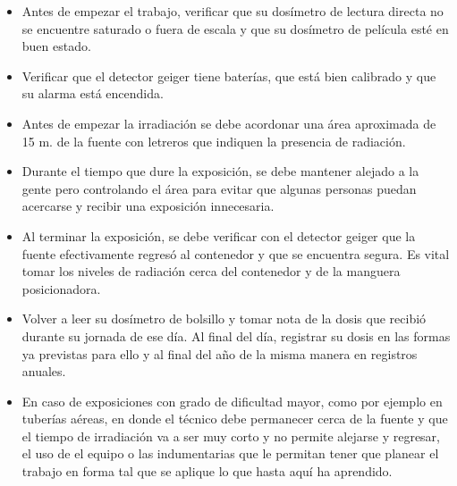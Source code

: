 \begin{itemize}
    \item Antes de empezar el trabajo, verificar que su dosímetro de lectura directa no se encuentre saturado o fuera de escala y que su dosímetro de película esté en buen estado.
    \item Verificar que el detector geiger tiene baterías, que está bien calibrado y que su alarma está encendida.
    \item Antes de empezar la irradiación se debe acordonar una área aproximada de 15 m. de la fuente con letreros que indiquen la presencia de radiación.
    \item Durante el tiempo que dure la exposición, se debe mantener alejado a la gente pero controlando el área para evitar que algunas personas puedan acercarse y recibir una exposición innecesaria.
    \item Al terminar la exposición, se debe verificar con el detector geiger que la fuente efectivamente regresó al contenedor y que se encuentra segura. Es vital tomar los niveles de radiación cerca del contenedor y de la manguera posicionadora.
    \item Volver a leer su dosímetro de bolsillo y tomar nota de la dosis que recibió durante su jornada de ese día. Al final del día, registrar su dosis en las formas ya previstas para ello y al final del año de la misma manera en registros anuales.
    \item En caso de exposiciones con grado de dificultad mayor, como por ejemplo en tuberías aéreas, en donde el técnico debe permanecer cerca de la fuente y que el tiempo de irradiación va a ser muy corto y no permite alejarse y regresar, el uso de el equipo o las indumentarias que le permitan tener que planear el trabajo en forma tal que se aplique lo que hasta aquí ha aprendido.
\end{itemize}
